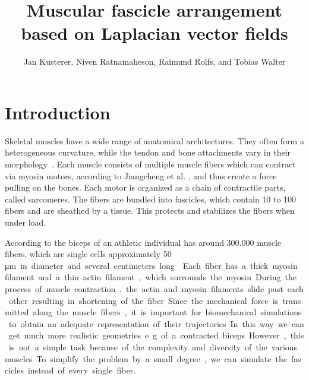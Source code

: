 \documentclass[preprint,journal]{vgtc}       %
\title{Muscular fascicle arrangement based on Laplacian vector fields}
\author{Jan Kusterer, Niven Ratnamaheson, Raimund Rolfs, and Tobias Walter}
\begin{document}
\maketitle

\section{Introduction}\label{sec:intro}
Skeletal muscles have a wide range of anatomical architectures. 
They often form a heterogeneous curvature, while the tendon and bone attachments vary in their morphology~\cite{Choi2013}. 
Each muscle consists of multiple muscle fibers which can contract via myosin motors, according to Jiangcheng et al. 
\cite{Jiangcheng2015}, and thus create a force pulling on the bones. 
Each motor is organized as a chain of contractile parts, called sarcomeres. 
The fibers are bundled into fascicles, which contain 10 to 100 fibers and are sheathed by a tissue.
This protects and stabilizes the fibers when under load.

According to \cite{Etemadi.et.Al.} the biceps of an athletic individual has around 300.000 muscle fibers, which are single cells approximately 50 \si\micro m in diameter and several centimeters long \cite{Cooper2000}. 
Each fiber has a thick myosin filament and a thin actin filament, which surrounds the myosin. 
During the process of muscle contraction, the actin and myosin filaments slide past each other resulting in shortening of the fiber.

Since the mechanical force is transmitted along the muscle fibers, it is important for biomechanical simulations to obtain an adequate representation of their trajectories. 
In this way we can get much more realistic geometries e.g. of a contracted biceps.
However, this is not a simple task because of the complexity and diversity of the various muscles. 
To simplify the problem by a small degree, we can simulate the fascicles instead of every single fiber.
\end{document}
